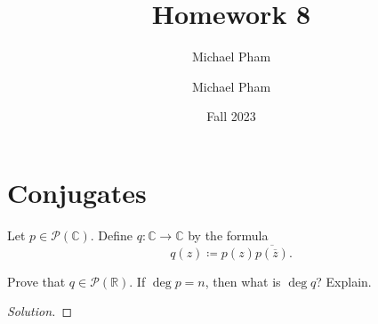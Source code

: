 \documentclass{article}
\title{#1}
\author{Michael Pham}
\date{#2}
\newenvironment{solution}{\begin{proof}[Solution]}{\end{proof}}
\newcommand{\CC}{\mathbb{C}}
\newcommand{\RR}{\mathbb{R}}
\newcommand{\mytitle}[2]{%
	\title{#1}
	\author{Michael Pham}
	\date{#2}
	\maketitle
	\newpage
	\tableofcontents
	\newpage
}
\begin{document}
	\mytitle{Homework 8}{Fall 2023}
	
	\section{Conjugates}
	\begin{hw}
		Let $p \in \mathscr{P}(\CC)$. Define $q : \CC \rightarrow \CC$ by the formula
		\begin{equation*}
			q(z) \coloneq p(z)\overline{p(\overline{z})}.
		\end{equation*}
	
		Prove that $q \in \mathscr{P}(\RR)$. If $\deg p = n$, then what is $\deg q$? Explain.
	\end{hw}
	\begin{solution}
		\begin{comment}
			Let us first suppose that $p$ is a constant polynomial.
		
		Now, we observe that for $p(z) \in \CC$, we can rewrite it as the following:
		\begin{equation*}
			p(z) = c(z-\lambda_{1})\cdots(z- \lambda_n), 
		\end{equation*}
		where $c, \lambda_0, \ldots, \lambda_n \in \CC$.
		
		Now, we observe the following:
		\begin{align*}
			p(\overline{z}) &= c(\overline{z}-\lambda_{1})\cdots(\overline{z}- \lambda_n) \\
			\overline{p(\overline{z})} &= \overline{c(\overline{z}-\lambda_{1})\cdots(\overline{z}- \lambda_n)} \\
			&= \overline{c}\overline{(\overline{z} - \lambda_1)}\cdots\overline{(\overline z - \lambda_n)} \\
			&= \overline{c}(z-\overline{\lambda_1})\cdots(z - \overline{\lambda_n})
		\end{align*}
	
		Then, from here, we observe that:
		\begin{align*}
			p(z)\overline{p(\overline{z})}
			&= \left[ c(z-\lambda_{1})\cdots(z- \lambda_n) \right]\left[ \overline{c}(z-\overline{\lambda_1})\cdots(z - \overline{\lambda_n})  \right] \\
			&= c\overline{c}(z-\lambda_1)(z-\overline{\lambda_1})\cdots(z-\lambda_n)(z-\overline{\lambda_{n}}) \\
			&= \lvert c \rvert^{2}(z-\lambda_1)(z-\overline{\lambda_1})\cdots(z-\lambda_n)(z-\overline{\lambda_n})
		\end{align*}
	

\end{comment}
\end{solution}
\end{document}
